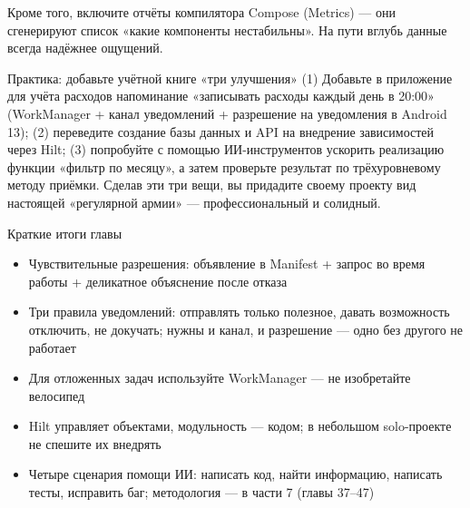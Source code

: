 Кроме того, включите отчёты компилятора Compose (Metrics) — они сгенерируют список «какие компоненты нестабильны». На пути вглубь данные всегда надёжнее ощущений.

\begin{tcbpractice}{Практика: добавьте учётной книге «три улучшения»}
(1) Добавьте в приложение для учёта расходов напоминание «записывать расходы каждый день в 20:00» (WorkManager + канал уведомлений + разрешение на уведомления в Android 13); (2) переведите создание базы данных и API на внедрение зависимостей через Hilt; (3) попробуйте с помощью ИИ-инструментов ускорить реализацию функции «фильтр по месяцу», а затем проверьте результат по трёхуровневому методу приёмки. Сделав эти три вещи, вы придадите своему проекту вид настоящей «регулярной армии» — профессиональный и солидный.

\end{tcbpractice}

\begin{tcbsummary}{Краткие итоги главы}
\begin{itemize}
  \item Чувствительные разрешения: объявление в Manifest + запрос во время работы + деликатное объяснение после отказа
  \item Три правила уведомлений: отправлять только полезное, давать возможность отключить, не докучать; нужны и канал, и разрешение — одно без другого не работает
  \item Для отложенных задач используйте WorkManager — не изобретайте велосипед
  \item Hilt управляет объектами, модульность — кодом; в небольшом solo-проекте не спешите их внедрять
  \item Четыре сценария помощи ИИ: написать код, найти информацию, написать тесты, исправить баг; методология — в части 7 (главы 37–47)
\end{itemize}

\end{tcbsummary}
